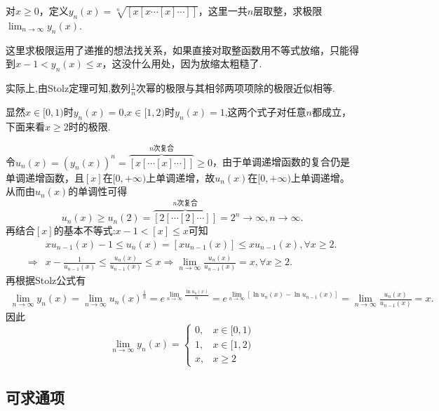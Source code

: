\documentclass[../../main.tex]{subfiles}%
\begin{document}
\begin{example}
对\(x\geqslant 0\)，定义\(y_n(x)=\sqrt[n]{[x[x\cdots[x]\cdots]]}\)，这里一共\(n\)层取整，求极限\(\lim_{n\rightarrow\infty}y_n(x)\).
\end{example}
\begin{note}
这里求极限运用了递推的想法找关系，如果直接对取整函数用不等式放缩，只能得到\(x - 1<y_n(x)\leqslant  x\)，这没什么用处，因为放缩太粗糙了.

实际上,由Stolz定理可知,数列$\frac{1}{n}$次幂的极限与其相邻两项项除的极限近似相等.
\end{note}
\begin{solution}

显然\(x\in[0,1)\)时\(y_n(x)=0\),\(x\in[1,2)\)时\(y_n(x)=1\),这两个式子对任意\(n\)都成立，下面来看\(x\geqslant 2\)时的极限.

令\(u_n(x) = (y_n(x))^n=\overbrace{[x[\cdots [x]\cdots ]]}^{n\text{次复合}}\geqslant 0\)，由于单调递增函数的复合仍是单调递增函数，且\([x]\)在\([0, +\infty)\)上单调递增，故\(u_n(x)\)在\([0, +\infty)\)上单调递增。
从而由\(u_n(x)\)的单调性可得
\[
u_n(x) \geqslant u_n(2)=\overbrace{[2[\cdots [2]\cdots ]]}^{n\text{次复合}} = 2^n\rightarrow \infty, n\rightarrow \infty.
\]
再结合\([x]\)的基本不等式:$x-1<\left[ x \right] \leqslant x$可知
\begin{align*}
&xu_{n-1}(x)-1\leqslant u_n(x)=[xu_{n-1}(x)]\leqslant xu_{n-1}(x),\forall x\geqslant 2.
\\
\Rightarrow &x-\frac{1}{u_{n-1}(x)}\leqslant \frac{u_n(x)}{u_{n-1}(x)}\leqslant x\Rightarrow \lim_{n\rightarrow \infty} \frac{u_n(x)}{u_{n-1}(x)}=x,\forall x\geqslant 2.
\end{align*}
再根据Stolz公式有
\begin{align*}
\lim_{n\rightarrow \infty} y_n(x)=\lim_{n\rightarrow \infty} u_n(x)^{\frac{1}{n}}=e^{\lim\limits_{n\rightarrow \infty} \frac{\ln u_n(x)}{n}}=e^{\lim\limits_{n\rightarrow \infty} [\ln u_n(x)-\ln u_{n-1}(x)]}=\lim_{n\rightarrow \infty} \frac{u_n(x)}{u_{n-1}(x)}=x.
\end{align*}
因此
\[ 
\lim_{n\rightarrow\infty}y_n(x)=
\begin{cases}
0, & x\in[0,1)\\
1, & x\in[1,2)\\
x, & x\geqslant 2
\end{cases}
\]

\end{solution}


\subsection{可求通项}
\end{document}
